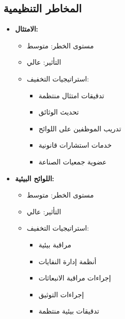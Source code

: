 \subsection{المخاطر التنظيمية}
\begin{itemize}
    \item \textbf{الامتثال:}
    \begin{itemize}
        \item مستوى الخطر: متوسط
        \item التأثير: عالي
        \item استراتيجيات التخفيف:
        \begin{itemize}
            \item تدقيقات امتثال منتظمة
            \item تحديث الوثائق
            \item تدريب الموظفين على اللوائح
            \item خدمات استشارات قانونية
            \item عضوية جمعيات الصناعة
        \end{itemize}
    \end{itemize}
    
    \item \textbf{اللوائح البيئية:}
    \begin{itemize}
        \item مستوى الخطر: متوسط
        \item التأثير: عالي
        \item استراتيجيات التخفيف:
        \begin{itemize}
            \item مراقبة بيئية
            \item أنظمة إدارة النفايات
            \item إجراءات مراقبة الانبعاثات
            \item إجراءات التوثيق
            \item تدقيقات بيئية منتظمة
        \end{itemize}
    \end{itemize}
\end{itemize}

